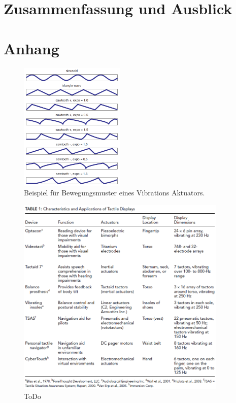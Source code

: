 \documentclass{llncs}					%
\begin{document}
\section{Zusammenfassung und Ausblick}

\newpage
\section{Anhang}

\begin{figure}[htbp]
	\begin{center}
		\includegraphics[width = 5cm]{Grafiken/2-Aktivierungsprofile.png}
		\caption{Beispiel für Bewegungsmuster eines Vibrations Aktuators\cite{5444662}. }
		\label{2-Aktivierungsprofile.png}
	\end{center}
\end{figure}

\begin{figure}[htbp]
	\begin{center}
		\includegraphics[width = 10cm]{Grafiken/4-Uebersicht-Projekte.png}
		\caption{ToDo}
		\label{4-Uebersicht-Projekte}
	\end{center}
\end{figure}
\end{document}
